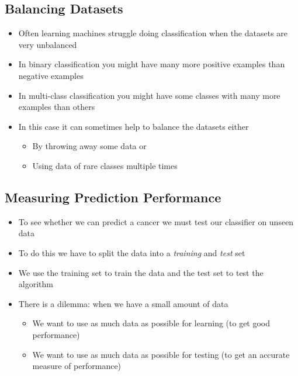 
\begin{slide}
\section{Balancing Datasets}

\begin{PauseHighLight}
  \begin{itemize}
  \item Often learning machines struggle doing classification when the
    datasets are very unbalanced\pause
  \item In binary classification you might have many more positive
    examples than negative examples\pause
  \item In multi-class classification you might have some classes with
    many more examples than others\pause
  \item In this case it can sometimes help to balance the datasets
    either
    \begin{itemize}
    \item By throwing away some data or
    \item Using data of rare classes multiple times\pause
    \end{itemize}
  \end{itemize}
\end{PauseHighLight}

\end{slide}


\begin{slide}
\section{Measuring Prediction Performance}

\begin{PauseHighLight}
  \begin{itemize}
  \item To see whether we can predict a cancer we must test our
    classifier on unseen data\pause
  \item To do this we have to split the data into a \emph{training} and
    \emph{test} set\pause
  \item We use the training set to train the data and the test set to
    test the algorithm\pause
  \item There is a dilemma: when we have a small amount of data
    \begin{itemize}\squeeze
    \item We want to use as much data as possible for learning (to get
      good performance)
    \item We want to use as much data as possible for testing (to get an
      accurate measure of performance)\pause
    \end{itemize}
  \end{itemize}
\end{PauseHighLight}

\end{slide}


